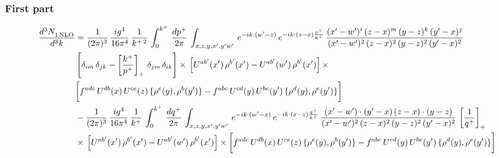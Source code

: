 \documentclass[9pt]{article}
\numberwithin{equation}{section}
\begin{document}
\subsubsection*{First part}
\begin{align}
     \frac{d^{3}N_{1\,\rm NLO}^{\rm}}{d^{3}k}  & = \frac{1}{(2\pi)^{3}}\, \frac{ig^{4}}{16\pi^{4}}\, \frac{1}{k^{+\,2}}\,\int_{0}^{k^{+}}\, \frac{dp^{+}}{2\pi}\,\int_{x,z,y,x',y'w'}\,e^{-ik\cdot (w^\prime-z)}\,e^{-ik\cdot (z-x)\frac{p^{+}}{k^{+}}}\,\frac{(x'-w')^{i}\,(z-x)^{m}\,(y-z)^{k}\,(y'-x)^{j}}{(x'-w')^{2}\,(z-x)^{2}\,(y-z)^{2}\,(y'-x)^{2}}\,\notag \\ & \left[\delta_{im}\,\delta_{jk}-\left[\frac{k^{+}}{p^{+}}\right]_{+}\, \delta_{jm}\,\delta_{ik}\right]\times\, \left[U^{ab'}(x')\,\rho^{b'}(x')-U^{ab'}(w')\,\rho^{b'}(x')\right]\times\notag \\ & \bigg[f^{adc}\,U^{db}(x)\,U^{ce}(z)\, \{\rho^{e}(y),\rho^{b}(y')\}-f^{abc}\,U^{cd}(y)\,U^{be}(y')\, \{\rho^{d}(y),\rho^{e}(y')\}\bigg]\notag \\ & -\frac{1}{(2\pi)^{3}}\, \frac{ig^{4}}{16\pi^{4}}\, \frac{1}{k^{+}}\,\int_{0}^{k^{+}}\, \frac{dq^{+}}{2\pi}\,\int_{x,z,y,x',y'w'}\,e^{-ik\cdot (w^\prime-x)}\,e^{-ik\cdot (x-z)\frac{q^{+}}{k^{+}}}\,\frac{(x'-w')\cdot (y'-x)\,(z-x)\cdot (y-z)}{(x'-w')^{2}\,(z-x)^{2}\,(y-z)^{2}\,(y'-x)^{2}}\,\left[\frac{1}{q^{+}}\right]_{+}\notag \\ & \times\, \left[U^{ab'}(x')\,\rho^{b'}(x')-U^{ab'}(w')\,\rho^{b'}(x')\right]\times \bigg[f^{adc}\,U^{db}(x)\,U^{ce}(z)\, \{\rho^{e}(y),\rho^{b}(y')\}-f^{abc}\,U^{cd}(y)\,U^{be}(y')\, \{\rho^{d}(y),\rho^{e}(y')\}\bigg]
\end{align}
\end{document}
